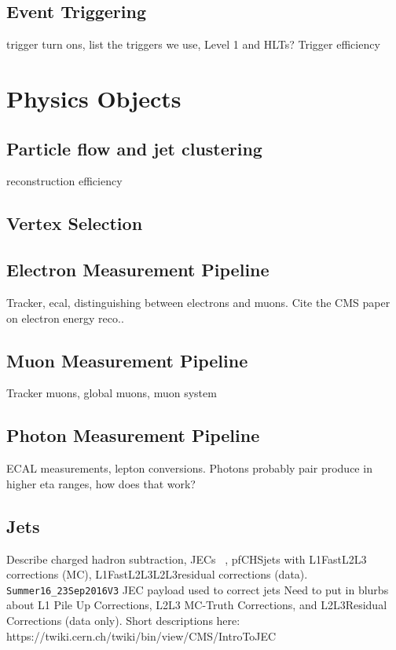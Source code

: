   \subsection{Event Triggering} \label{sec:event_triggering}
    trigger turn ons, list the triggers we use, Level 1 and HLTs? Trigger efficiency 
\section{Physics Objects}
  \subsection{Particle flow and jet clustering} \label{sec:particle_flow}
    reconstruction efficiency
  \subsection{Vertex Selection} \label{sec:vertex_selection}
  \subsection{Electron Measurement Pipeline} \label{sec:electron_measurement_pipeline}
    Tracker, ecal, distinguishing between electrons and muons. Cite the CMS paper on electron energy reco.. \cite{Electron_reco}
  \subsection{Muon Measurement Pipeline} \label{sec:muon_measurement_pipeline}
    Tracker muons, global muons, muon system
  \subsection{Photon Measurement Pipeline}
    ECAL measurements, lepton conversions. Photons probably pair produce in higher eta ranges, how does that work?
  \subsection{Jets} \label{sec:jets}
    Describe charged hadron subtraction, JECs ~\cite{JERC}, \cite{JEC_2016}
    pfCHSjets with L1FastL2L3 corrections (MC), L1FastL2L3L2L3residual corrections (data).
    \verb=Summer16_23Sep2016V3= JEC payload used to correct jets
    Need to put in blurbs about L1 Pile Up Corrections, L2L3 MC-Truth Corrections, and L2L3Residual Corrections (data only). Short descriptions here: https://twiki.cern.ch/twiki/bin/view/CMS/IntroToJEC 

